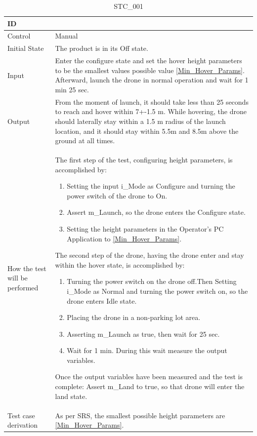 \documentclass[12pt, titlepage]{article}
\begin{document}
\begin{enumerate}
\begin{table}[!h]
\begin{center}
\caption {STC\_001}
\label{tab:STC_001}
\begin{tabular}{ | m{1.5cm} | m{15cm} | } 
\hline
ID & \nameref{tab:STC_001} \\ 
\hline
Control & Manual \\ 
\hline
Initial State & The product is in its Off state.\nameref{SRS:TRANS_004} \nameref{SRS:PERF_007} \\ 
\hline
Input & Enter the configure state and set the hover height parameters to be the smallest values possible value \ref{Min_Hover_Params}. Afterward, launch the drone in normal operation and wait for 1 min 25 sec. \\ 
\hline
Output & From the moment of launch, it should take less than 25 seconds to reach and hover within 7+-1.5 m. While hovering, the drone should laterally stay within a 1.5 m radius of the launch location, and it should stay within 5.5m and 8.5m above the ground at all times. \\ 
\hline
How the test will be performed & 
The first step of the test, configuring height parameters, is accomplished by:
\begin{enumerate}[topsep=0pt,itemsep=-1ex,partopsep=1ex,parsep=1ex]
    \item Setting the input i\_Mode as Configure and turning the power switch of the drone to On.
    \item Assert m\_Launch, so the drone enters the Configure state.
    \item Setting the height parameters in the Operator's PC Application to \ref{Min_Hover_Params}.
\end{enumerate}
The second step of the drone, having the drone enter and stay within the hover state, is accomplished by:
\begin{enumerate}[topsep=0pt,itemsep=-1ex,partopsep=1ex,parsep=1ex]
	\item Turning the power switch on the drone off.Then Setting i\_Mode as Normal and turning the power switch on, so the drone enters  Idle state.
	\item Placing the drone in a non-parking lot area. 
	\item Asserting m\_Launch as true, then wait for 25 sec.
	\item Wait for 1 min. During this wait measure the output variables.
\end{enumerate}
Once the output variables have been measured and the test is complete:
Assert m_Land to true, so that drone will enter the land state.\\ 
\hline
Test case derivation & As per SRS, the smallest possible height parameters are \ref{Min_Hover_Params}. 


\end{tabular}
\end{center}
\end{table}
\end{enumerate}
\end{document}
